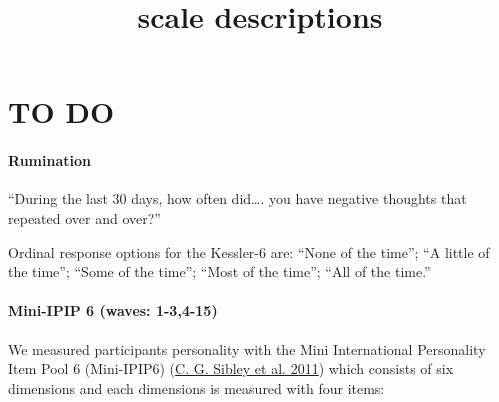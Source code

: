 \documentclass[
  singlecolumn]{report}
\title{scale descriptions}
\author{}
\date{}
\begin{document}
\maketitle
\ifdefined\Shaded\renewenvironment{Shaded}{\begin{tcolorbox}[borderline west={3pt}{0pt}{shadecolor}, boxrule=0pt, enhanced, breakable, interior hidden, frame hidden, sharp corners]}{\end{tcolorbox}}\fi

\listoffigures
\listoftables
\hypertarget{to-do}{%
\chapter{TO DO}\label{to-do}}

\hypertarget{rumination}{%
\subsubsection{Rumination}\label{rumination}}

``During the last 30 days, how often did\ldots. you have negative
thoughts that repeated over and over?''

Ordinal response options for the Kessler-6 are: ``None of the time'';
``A little of the time''; ``Some of the time''; ``Most of the time'';
``All of the time.''

\hypertarget{mini-ipip-6-waves-1-34-15}{%
\subsubsection{Mini-IPIP 6 (waves:
1-3,4-15)}\label{mini-ipip-6-waves-1-34-15}}

We measured participants personality with the Mini International
Personality Item Pool 6 (Mini-IPIP6)
(\protect\hyperlink{ref-sibley2011}{C. G. Sibley et al. 2011}) which
consists of six dimensions and each dimensions is measured with four
items:
\end{document}
